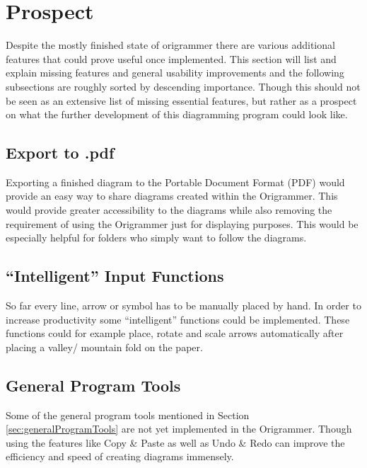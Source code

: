 
\section{Prospect}
\label{sec:prospect}

Despite the mostly finished state of \gls{origrammer} there are various additional features that could prove useful once implemented. This section will list and explain missing features and general usability improvements and the following subsections are roughly sorted by descending importance. Though this should not be seen as an extensive list of missing essential features, but rather as a prospect on what the further development of this diagramming program could look like. 

\subsection{Export to .pdf}

Exporting a finished diagram to the Portable Document Format (PDF) would provide an easy way to share diagrams created within the Origrammer. This would provide greater accessibility to the diagrams while also removing the requirement of using the Origrammer just for displaying purposes. This would be especially helpful for folders who simply want to follow the diagrams.

\subsection{``Intelligent'' Input Functions}

So far every line, arrow or symbol has to be manually placed by hand. In order to increase productivity some ``intelligent'' functions could be implemented. These functions could for example place, rotate and scale arrows automatically after placing a valley/ mountain fold on the paper.

\subsection{General Program Tools}

Some of the general program tools mentioned in Section \ref{sec:generalProgramTools} are not yet implemented in the Origrammer. Though using the features like Copy \& Paste as well as Undo \& Redo can improve the efficiency and speed of creating diagrams immensely.

